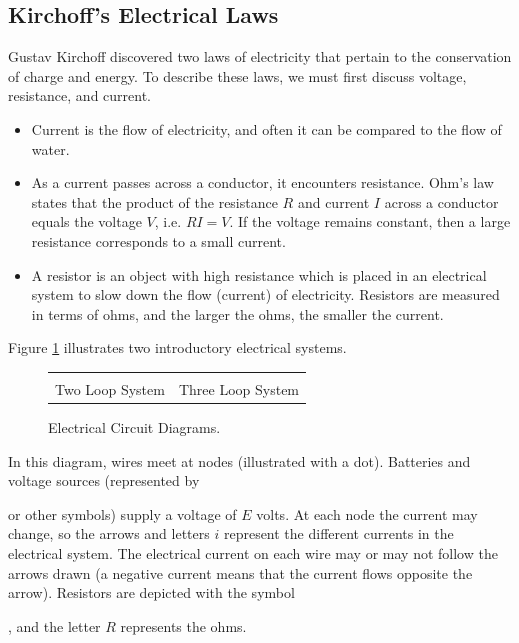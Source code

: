 \subsection{Kirchoff's Electrical Laws}
Gustav Kirchoff discovered two laws of electricity that pertain to the conservation of charge and energy.  To describe these laws, we must first discuss voltage, resistance, and current.  
\begin{itemize}
 \item Current is the flow of electricity, and often it can be compared to the flow of water.  
 \item As a current passes across a conductor, it encounters resistance. Ohm's law states that the product of the resistance $R$ and current $I$ across a conductor equals the voltage $V$, i.e. $RI=V$. If the voltage remains constant, then a large resistance corresponds to a small current. 
 \item A resistor is an object with high resistance which is placed in an electrical system to slow down the flow (current) of electricity.  Resistors are measured in terms of ohms, and the larger the ohms, the smaller the current.   
\end{itemize}
Figure \ref{ecir} illustrates two introductory electrical systems.
\begin{figure}[htb]
\begin{center}
\begin{tabular}{cc}

&

\\
Two Loop System & Three Loop System
\end{tabular}\end{center}
\caption{Electrical Circuit Diagrams.\label{ecir}}
\end{figure}
In this diagram, wires meet at nodes (illustrated with a dot).  
Batteries and voltage sources (represented by 
or other symbols)
supply a voltage of $E$ volts.  At each node the current may change, so the arrows and letters $i$ represent the different currents in the electrical system. The electrical current on each wire may or may not follow the arrows drawn (a negative current means that the current flows opposite the arrow). Resistors are depicted with the symbol 	
, and the letter $R$ represents the ohms. 

